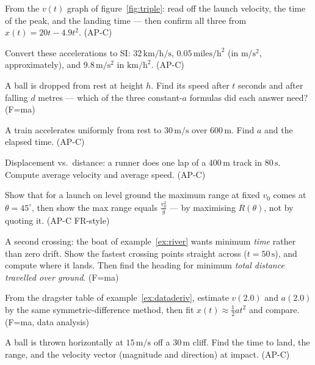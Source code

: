 \begin{exercise}[easy]
From the $v(t)$ graph of figure~\ref{fig:triple}: read off the launch
velocity, the time of the peak, and the landing time --- then confirm all
three from $x(t)=20t-4.9t^{2}$. (AP-C)
\end{exercise}
\begin{exercise}[easy]
Convert these accelerations to SI: $32\,\mathrm{km/h/s}$,
$0.05\,\mathrm{miles/h^{2}}$ (in $\mathrm{m/s^{2}}$, approximately), and
$9.8\,\mathrm{m/s^{2}}$ in $\mathrm{km/h^{2}}$. (AP-C)
\end{exercise}
\begin{exercise}[easy]
A ball is dropped from rest at height $h$. Find its speed after $t$ seconds
and after falling $d$ metres --- which of the three constant-$a$ formulas did
each answer need? (F=ma)
\end{exercise}
\begin{exercise}[easy]
A train accelerates uniformly from rest to $30\,\mathrm{m/s}$ over
$600\,\mathrm{m}$. Find $a$ and the elapsed time. (AP-C)
\end{exercise}
\begin{exercise}[easy]
Displacement vs.\ distance: a runner does one lap of a $400\,\mathrm{m}$
track in $80\,\mathrm{s}$. Compute average velocity and average speed. (AP-C)
\end{exercise}
\begin{exercise}[medium]
Show that for a launch on level ground the maximum range at fixed $v_0$
comes at $\theta=45^{\circ}$, then show the max range equals
$\frac{v_0^{2}}{g}$ --- by maximising $R(\theta)$, not by quoting it. (AP-C FR-style)
\end{exercise}
\begin{exercise}[medium]
A second crossing: the boat of example~\ref{ex:river} wants minimum
\emph{time} rather than zero drift. Show the fastest crossing points
straight across ($t=50\,\mathrm{s}$), and compute where it lands. Then find
the heading for minimum \emph{total distance travelled over ground}.
(F=ma)
\end{exercise}
\begin{exercise}[medium]
From the dragster table of example~\ref{ex:dataderiv}, estimate $v(2.0)$
and $a(2.0)$ by the same symmetric-difference method, then fit
$x(t)\approx\tfrac12at^{2}$ and compare. (F=ma, data analysis)
\end{exercise}
\begin{exercise}[medium]
A ball is thrown horizontally at $15\,\mathrm{m/s}$ off a
$30\,\mathrm{m}$ cliff. Find the time to land, the range, and the velocity
vector (magnitude and direction) at impact. (AP-C)
\end{exercise}
